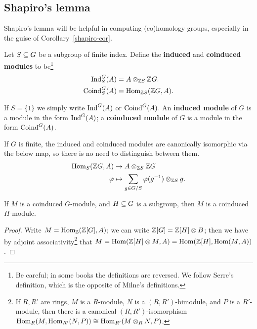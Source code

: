 \subsection{Shapiro's lemma}
Shapiro's lemma will be helpful in computing (co)homology groups, especially in the guise of Corollary~\ref{shapiro-cor}.
\begin{df}
Let $S\subseteq G$ be a subgroup of finite index. %
Define the \textbf{induced} and \textbf{coinduced modules} to be\footnote{Be careful; in some books the definitions are reversed. We follow Serre's definition, which is the opposite of Milne's definitions.}
\begin{align*}
\operatorname{Ind}_S^G (A)&=A\otimes_{\mathbb{Z} S} \mathbb{Z} G.\\
\operatorname{Coind}_S^G (A)&=\operatorname{Hom}_{\mathbb{Z} S}(\mathbb{Z} G,A).
\end{align*}

If $S=\{1\}$ we simply write $\operatorname{Ind}^G(A)$ or $\operatorname{Coind}^G(A)$. 
An \textbf{induced module} of $G$ is a module in the form $\operatorname{Ind}^G(A)$; a \textbf{coinduced module} of $G$ is a module in the form $\operatorname{Coind}^G(A)$.
\end{df}
\begin{rem}
If $G$ is finite, the induced and coinduced modules  are canonically isomorphic via the below map, so there is no need to distinguish between them.
\begin{align*}
\operatorname{Hom}_S(\mathbb{Z} G,A)&\to A\otimes_{\mathbb{Z} S}\mathbb{Z} G \\
\varphi& \mapsto \sum_{g\in G/S} \varphi(g^{-1})\otimes_{\mathbb{Z} S}g.
\end{align*}
\end{rem}
\begin{pr}
If $M$ is a coinduced $G$-module, and $H\subseteq G$ is a subgroup, then $M$ is a coinduced $H$-module.
\end{pr}
\begin{proof}
Write $M=\operatorname{Hom}_{\mathbb{Z}}(\mathbb{Z}[G],A)$; we can write $\mathbb{Z}[G]=\mathbb{Z}[H]\otimes B$; then we have by adjoint associativity\footnote{If $R,R'$ are rings, $M$ is a $R$-module, $N$ is a $(R,R')$-bimodule, and $P$ is a $R'$-module, then there is a canonical $(R,R')$-isomorphism $\operatorname{Hom}_R(M,\operatorname{Hom}_{R'}(N,P))\cong\operatorname{Hom}_{R'}(M\otimes_R N,P) $.} that $M=\operatorname{Hom}(\mathbb{Z}[H]\otimes M,A)=\operatorname{Hom}(\mathbb{Z}[H],\operatorname{Hom}(M,A))$. 
\end{proof}
